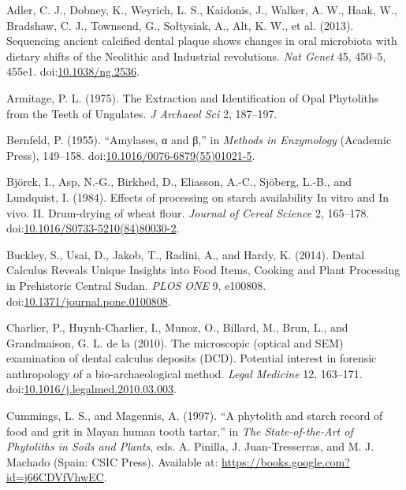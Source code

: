 \documentclass[utf8]{../templates/frontiersSCNS}
\newlength{\cslhangindent}
\newlength{\cslentryspacingunit} %
\newenvironment{CSLReferences}[2] %
 {%
  \setlength{\parindent}{0pt}
  \ifodd #1
  \let\oldpar\par
  \def\par{\hangindent=\cslhangindent\oldpar}
  \fi
  \setlength{\parskip}{#2\cslentryspacingunit}
 }%
 {}
\begin{document}
\hypertarget{refs}{}
\begin{CSLReferences}{1}{0}
\leavevmode{}%
Adler, C. J., Dobney, K., Weyrich, L. S., Kaidonis, J., Walker, A. W., Haak, W., Bradshaw, C. J., Townsend, G., Sołtysiak, A., Alt, K. W., et al. (2013). Sequencing ancient calcified dental plaque shows changes in oral microbiota with dietary shifts of the {Neolithic} and {Industrial} revolutions. \emph{Nat Genet} 45, 450--5, 455e1. doi:\href{https://doi.org/10.1038/ng.2536}{10.1038/ng.2536}.

\leavevmode{}%
Armitage, P. L. (1975). The {Extraction} and {Identification} of {Opal Phytoliths} from the {Teeth} of {Ungulates}. \emph{J Archaeol Sci} 2, 187--197.

\leavevmode{}%
Bernfeld, P. (1955). {``Amylases, α and β,''} in \emph{Methods in {Enzymology}} ({Academic Press}), 149--158. doi:\href{https://doi.org/10.1016/0076-6879(55)01021-5}{10.1016/0076-6879(55)01021-5}.

\leavevmode{}%
Björck, I., Asp, N.-G., Birkhed, D., Eliasson, A.-C., Sjöberg, L.-B., and Lundquist, I. (1984). Effects of processing on starch availability {In} vitro and {In} vivo. {II}. {Drum-drying} of wheat flour. \emph{Journal of Cereal Science} 2, 165--178. doi:\href{https://doi.org/10.1016/S0733-5210(84)80030-2}{10.1016/S0733-5210(84)80030-2}.

\leavevmode{}%
Buckley, S., Usai, D., Jakob, T., Radini, A., and Hardy, K. (2014). Dental {Calculus Reveals Unique Insights} into {Food Items}, {Cooking} and {Plant Processing} in {Prehistoric Central Sudan}. \emph{PLOS ONE} 9, e100808. doi:\href{https://doi.org/10.1371/journal.pone.0100808}{10.1371/journal.pone.0100808}.

\leavevmode{}%
Charlier, P., Huynh-Charlier, I., Munoz, O., Billard, M., Brun, L., and Grandmaison, G. L. de la (2010). The microscopic (optical and {SEM}) examination of dental calculus deposits ({DCD}). {Potential} interest in forensic anthropology of a bio-archaeological method. \emph{Legal Medicine} 12, 163--171. doi:\href{https://doi.org/10.1016/j.legalmed.2010.03.003}{10.1016/j.legalmed.2010.03.003}.

\leavevmode{}%
Cummings, L. S., and Magennis, A. (1997). {``A phytolith and starch record of food and grit in {Mayan} human tooth tartar,''} in \emph{The {State-of-the-Art} of {Phytoliths} in {Soils} and {Plants}}, eds. A. Pinilla, J. Juan-Tresserras, and M. J. Machado ({Spain}: {CSIC Press}). Available at: \url{https://books.google.com?id=j66CDVfVhwEC}.


\end{CSLReferences}
\end{document}
